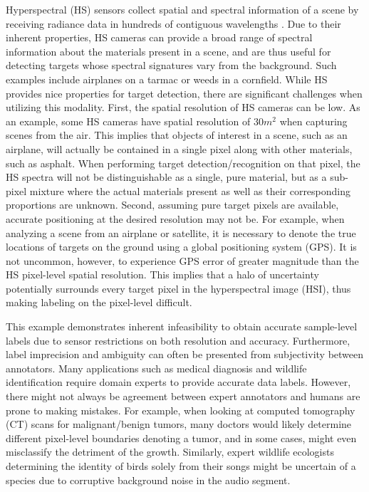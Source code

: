 Hyperspectral (HS) sensors collect spatial and spectral information of a scene by receiving radiance data in hundreds of contiguous wavelengths \citep{Zare2008Thesis}.  Due to their inherent properties, HS cameras can provide a broad range of spectral information about the materials present in a scene, and are thus useful for detecting targets whose spectral signatures vary from the background.  Such examples include airplanes on a tarmac or weeds in a cornfield.  While HS provides nice properties for target detection, there are significant challenges when utilizing this modality.  First, the spatial resolution of HS cameras can be low.  As an example, some HS cameras have spatial resolution of $30m^2$ when capturing scenes from the air.  This implies that objects of interest in a scene, such as an airplane, will actually be contained in a single pixel along with other materials, such as asphalt.  When performing target detection/recognition on that pixel, the HS spectra will not be distinguishable as a single, pure material, but as a sub-pixel mixture where the actual materials present as well as their corresponding proportions are unknown. Second, assuming pure target pixels are available, accurate positioning at the desired resolution may not be.  For example, when analyzing a scene from an airplane or satellite, it is necessary to denote the true locations of targets on the ground using a global positioning system (GPS). It is not uncommon, however, to experience GPS error of greater magnitude than the HS pixel-level spatial resolution.  This implies that a halo of uncertainty potentially surrounds every target pixel in the hyperspectral image (HSI), thus making labeling on the pixel-level difficult.

This example demonstrates inherent infeasibility to obtain accurate sample-level labels due to sensor restrictions on both resolution and accuracy.  Furthermore, label imprecision and ambiguity can often be presented from subjectivity between annotators. Many applications such as medical diagnosis and wildlife identification require domain experts to provide accurate data labels.  However, there might not always be agreement between expert annotators and humans are prone to making mistakes.  For example, when looking at computed tomography (CT) scans for malignant/benign tumors, many doctors would likely determine different pixel-level boundaries denoting a tumor, and in some cases, might even misclassify the detriment of the growth.  Similarly, expert wildlife  ecologists determining the identity of birds solely from their songs might be uncertain of a species due to corruptive background noise in the audio segment.

